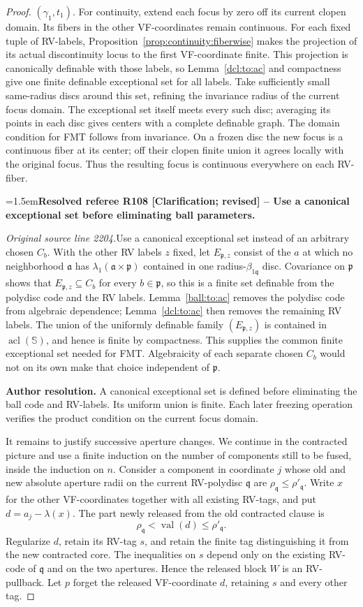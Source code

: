 \documentclass[12pt]{amsart}
\newcommand{\ResolvedRefereeRemark}[5]{%
  \par\medskip\begingroup\normalfont\small\color{gray}%
  \emergencystretch=1.5em\noindent\textbf{Resolved referee R#1 [#2] -- #3.}\par\nobreak\noindent #4\par
  \medskip\color{ResolutionGreen}\noindent\textbf{Author resolution.} #5\par
  \endgroup\medskip
}
\theoremstyle{plain}
\theoremstyle{definition}
\theoremstyle{remark}
\numberwithin{equation}{section}
\theoremstyle{plain}
\DeclareMathOperator{\acl}{acl}
\newcommand{\ga}{\mathfrak{a}}
\newcommand{\gp}{\mathfrak{p}}
\newcommand{\gq}{\mathfrak{q}}
\newcommand{\0}{\emptyset}
\DeclareMathOperator{\vv}{val}
\begin{document}
\begin{proof}
$(\gamma_{1}, t_{1})$. For continuity, extend each focus by zero off its current clopen domain. Its fibers in the other VF-coordinates remain continuous. For each fixed tuple of RV-labels, Proposition~\ref{prop:continuity:fiberwise} makes the projection of its actual discontinuity locus to the first VF-coordinate finite. This projection is canonically definable with those labels, so Lemma~\ref{dcl:to:ac} and compactness give one finite definable exceptional set for all labels. Take sufficiently small same-radius discs around this set, refining the invariance radius of the current focus domain. The exceptional set itself meets every such disc; averaging its points in each disc gives centers with a complete definable graph. The domain condition for FMT follows from invariance. On a frozen disc the new focus is a continuous fiber at its center; off their clopen finite union it agrees locally with the original focus. Thus the resulting focus is continuous everywhere on each RV-fiber.

\ResolvedRefereeRemark{108}{Clarification; revised}{Use a canonical exceptional set before eliminating ball parameters}{%
\textit{Original source line 2204.}\quad Use a canonical exceptional set instead of an arbitrary chosen $C_b$. With the other RV labels $z$ fixed, let $E_{\gp,z}$ consist of the $a$ at which no neighborhood $\ga$ has $\lambda_1(\ga\times\gp)$ contained in one radius-$\beta_{1\gq}$ disc. Covariance on $\gp$ shows that $E_{\gp,z}\subseteq C_b$ for every $b\in\gp$, so this is a finite set definable from the polydisc code and the RV labels. Lemma~\ref{ball:to:ac} removes the polydisc code from algebraic dependence; Lemma~\ref{dcl:to:ac} then removes the remaining RV labels. The union of the uniformly definable family $(E_{\gp,z})$ is contained in $\acl(\mathbb S)$, and hence is finite by compactness. This supplies the common finite exceptional set needed for FMT. Algebraicity of each separate chosen $C_b$ would not on its own make that choice independent of $\gp$.
}{A canonical exceptional set is defined before eliminating the ball code and RV-labels. Its uniform union is finite. Each later freezing operation verifies the product condition on the current focus domain.}

It remains to justify successive aperture changes. We continue in the contracted picture and use a finite induction on the number of components still to be fused, inside the induction on $n$. Consider a component in coordinate $j$ whose old and new absolute aperture radii on the current RV-polydisc $\gq$ are $\rho_\gq\leq\rho'_\gq$. Write $x$ for the other VF-coordinates together with all existing RV-tags, and put $d=a_j-\lambda(x)$. The part newly released from the old contracted clause is
\[
\rho_\gq<\vv(d)\leq\rho'_\gq.
\]
Regularize $d$, retain its RV-tag $s$, and retain the finite tag distinguishing it from the new contracted core. The inequalities on $s$ depend only on the existing RV-code of $\gq$ and on the two apertures. Hence the released block $W$ is an RV-pullback. Let $p$ forget the released VF-coordinate $d$, retaining $s$ and every other tag.


\end{proof}
\end{document}
